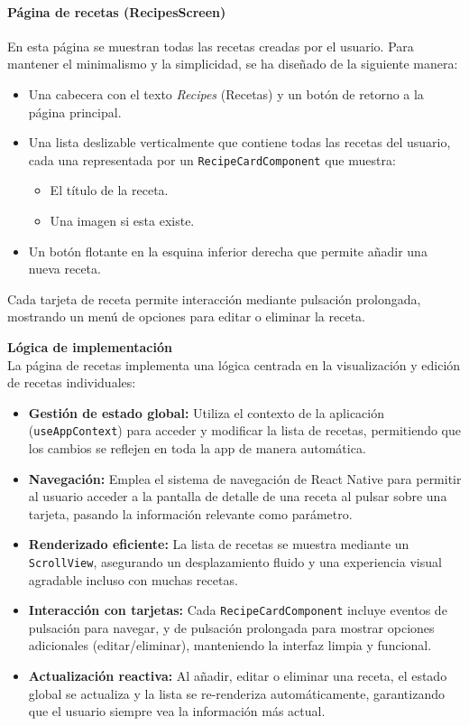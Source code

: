 \documentclass[twoside, openright, 11pt]{report}
\begin{document}
				
				\paragraph{Página de recetas (RecipesScreen)}
					En esta página se muestran todas las recetas creadas por el usuario. Para mantener el minimalismo y la simplicidad, se ha diseñado de la siguiente manera:
					
					\begin{itemize}
						\item Una cabecera con el texto \textit{Recipes} (Recetas) y un botón de retorno a la página principal.
						\item Una lista deslizable verticalmente que contiene todas las recetas del usuario, cada una representada por un \texttt{RecipeCardComponent} que muestra:
						\begin{itemize}
							\item El título de la receta.
							\item Una imagen si esta existe.
						\end{itemize}
						\item Un botón flotante en la esquina inferior derecha que permite añadir una nueva receta.
					\end{itemize}
					
					Cada tarjeta de receta permite interacción mediante pulsación prolongada, mostrando un menú de opciones para editar o eliminar la receta.
					
					\textbf{Lógica de implementación}\\
					La página de recetas implementa una lógica centrada en la visualización y edición de recetas individuales:
					
					\begin{itemize}
						\item \textbf{Gestión de estado global:} Utiliza el contexto de la aplicación (\texttt{useAppContext}) para acceder y modificar la lista de recetas, permitiendo que los cambios se reflejen en toda la app de manera automática.
						\item \textbf{Navegación:} Emplea el sistema de navegación de React Native para permitir al usuario acceder a la pantalla de detalle de una receta al pulsar sobre una tarjeta, pasando la información relevante como parámetro.
						\item \textbf{Renderizado eficiente:} La lista de recetas se muestra mediante un \texttt{ScrollView}, asegurando un desplazamiento fluido y una experiencia visual agradable incluso con muchas recetas.
						\item \textbf{Interacción con tarjetas:} Cada \texttt{RecipeCardComponent} incluye eventos de pulsación para navegar, y de pulsación prolongada para mostrar opciones adicionales (editar/eliminar), manteniendo la interfaz limpia y funcional.
						\item \textbf{Actualización reactiva:} Al añadir, editar o eliminar una receta, el estado global se actualiza y la lista se re-renderiza automáticamente, garantizando que el usuario siempre vea la información más actual.
					\end{itemize}
					
\end{document}
